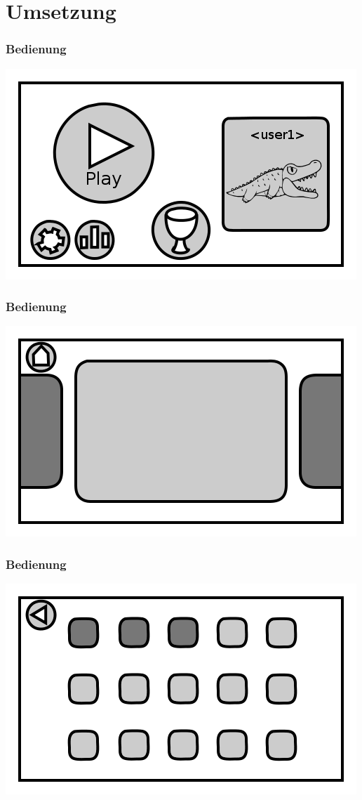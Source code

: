 \documentclass[t]{beamer}
\begin{document}
\section{Umsetzung}
\begin{frame}
	\frametitle{Bedienung}
	\includegraphics[height=\textheight]{main_menu.png}
\end{frame}
\begin{frame}
	\frametitle{Bedienung}
	\includegraphics[height=\textheight]{level_overview.png}
\end{frame}
\begin{frame}
	\frametitle{Bedienung}
	\includegraphics[height=\textheight]{level_overview_detail.png}
\end{frame}
\end{document}
